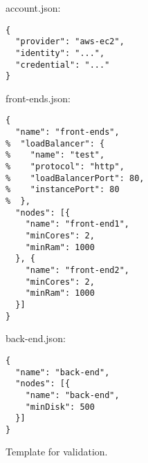 \begin{figure}
  \begin{center}
    account.json:
    \begin{verbatim}
{
  "provider": "aws-ec2", 
  "identity": "...",
  "credential": "..."
}
    \end{verbatim}
    front-ends.json:
    \begin{verbatim}
{
  "name": "front-ends",
%  "loadBalancer": {
%    "name": "test",
%    "protocol": "http",
%    "loadBalancerPort": 80,
%    "instancePort": 80
%  },
  "nodes": [{   
    "name": "front-end1",
    "minCores": 2,
    "minRam": 1000
  }, {   
    "name": "front-end2",
    "minCores": 2,
    "minRam": 1000
  }]
}
    \end{verbatim}
    back-end.json:
    \begin{verbatim}
{
  "name": "back-end",
  "nodes": [{   
    "name": "back-end",
    "minDisk": 500
  }]
}
    \end{verbatim}
  \end{center}
  \caption{Template for validation.}
  \label{list:validation-threenodes}
\end{figure}

